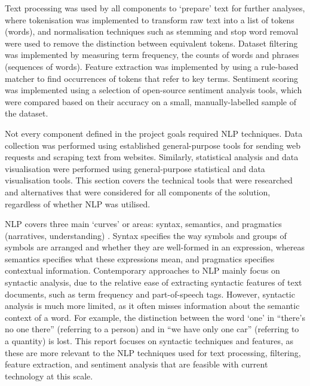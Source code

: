 \documentclass{report}
\begin{document}
Text processing was used by all components to `prepare' text for further analyses, where tokenisation was implemented to transform raw text into a list of tokens (words), and normalisation techniques such as stemming and stop word removal \cite{Nltk} were used to remove the distinction between equivalent tokens.
Dataset filtering was implemented by measuring term frequency, the counts of words and phrases (sequences of words).
Feature extraction was implemented by using a rule-based matcher to find occurrences of tokens that refer to key terms.
Sentiment scoring was implemented using a selection of open-source sentiment analysis tools, which were compared based on their accuracy on a small, manually-labelled sample of the dataset.

Not every component defined in the project goals required NLP techniques.
Data collection was performed using established general-purpose tools for sending web requests and scraping text from websites.
Similarly, statistical analysis and data visualisation were performed using general-purpose statistical and data visualisation tools.
This section covers the technical tools that were researched and alternatives that were considered for all components of the solution, regardless of whether NLP was utilised.

NLP covers three main `curves' or areas: syntax, semantics, and pragmatics (narratives, understanding) \cite{cambria2014jumping}. 
Syntax specifies the way symbols and groups of symbols are arranged and whether they are well-formed in an expression, whereas semantics specifies what these expressions mean, and pragmatics specifies contextual information.
Contemporary approaches to NLP mainly focus on syntactic analysis, due to the relative ease of extracting syntactic features of text documents, such as term frequency and part-of-speech tags.
However, syntactic analysis is much more limited, as it often misses information about the semantic context of a word.
For example, the distinction between the word `one' in ``there's no one there'' (referring to a person) and in ``we have only one car'' (referring to a quantity) is lost.
This report focuses on syntactic techniques and features, as these are more relevant to the NLP techniques used for text processing, filtering, feature extraction, and sentiment analysis that are feasible with current technology at this scale.
\end{document}
